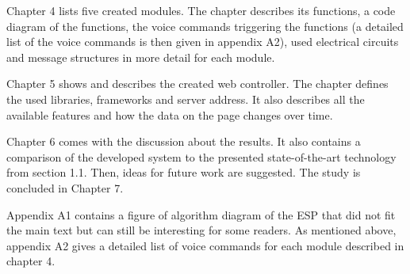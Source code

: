 Chapter 4 lists five created modules. The chapter describes its functions, a code diagram of the functions, the voice commands triggering the functions (a detailed list of the voice commands is then given in appendix A2), used electrical circuits and message structures in more detail for each module.

Chapter 5 shows and describes the created web controller. The chapter defines the used libraries, frameworks and server address. It also describes all the available features and how the data on the page changes over time.

Chapter 6 comes with the discussion about the results. It also contains a comparison of the developed system to the presented state-of-the-art technology from section 1.1. Then, ideas for future work are suggested. The study is concluded in Chapter 7.

Appendix A1 contains a figure of algorithm diagram of the ESP that did not fit the main text but can still be interesting for some readers. As mentioned above, appendix A2 gives a detailed list of voice commands for each module described in chapter 4.